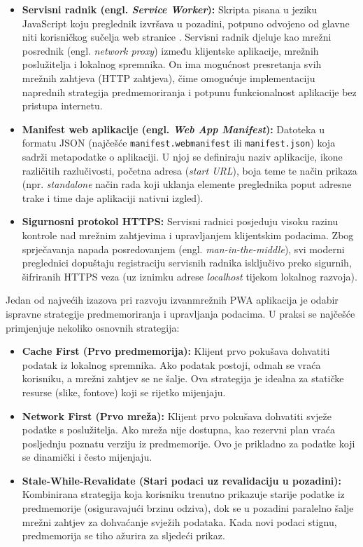 \documentclass[a4paper,12pt,oneside]{article}
\begin{document}
	\begin{itemize}
		\item \textbf{Servisni radnik (engl. \textit{Service Worker}):} Skripta pisana u jeziku JavaScript koju preglednik izvršava u pozadini, potpuno odvojeno od glavne niti korisničkog sučelja web stranice \cite{w_mdn_serviceworker}. Servisni radnik djeluje kao mrežni posrednik (engl. \textit{network proxy}) između klijentske aplikacije, mrežnih poslužitelja i lokalnog spremnika. On ima mogućnost presretanja svih mrežnih zahtjeva (HTTP zahtjeva), čime omogućuje implementaciju naprednih strategija predmemoriranja i potpunu funkcionalnost aplikacije bez pristupa internetu.
		
		\item \textbf{Manifest web aplikacije (engl. \textit{Web App Manifest}):} Datoteka u formatu JSON (najčešće \texttt{manifest.webmanifest} ili \texttt{manifest.json}) koja sadrži metapodatke o aplikaciji. U njoj se definiraju naziv aplikacije, ikone različitih razlučivosti, početna adresa (\textit{start URL}), boja teme te način prikaza (npr. \textit{standalone} način rada koji uklanja elemente preglednika poput adresne trake i time daje aplikaciji nativni izgled).
		
		\item \textbf{Sigurnosni protokol HTTPS:} Servisni radnici posjeduju visoku razinu kontrole nad mrežnim zahtjevima i upravljanjem klijentskim podacima. Zbog sprječavanja napada posredovanjem (engl. \textit{man-in-the-middle}), svi moderni preglednici dopuštaju registraciju servisnih radnika isključivo preko sigurnih, šifriranih HTTPS veza (uz iznimku adrese \textit{localhost} tijekom lokalnog razvoja).
	\end{itemize}
	
	Jedan od najvećih izazova pri razvoju izvanmrežnih PWA aplikacija je odabir ispravne strategije predmemoriranja i upravljanja podacima. U praksi se najčešće primjenjuje nekoliko osnovnih strategija:
	\begin{itemize}
		\item \textbf{Cache First (Prvo predmemorija):} Klijent prvo pokušava dohvatiti podatak iz lokalnog spremnika. Ako podatak postoji, odmah se vraća korisniku, a mrežni zahtjev se ne šalje. Ova strategija je idealna za statičke resurse (slike, fontove) koji se rijetko mijenjaju.
		
		\item \textbf{Network First (Prvo mreža):} Klijent prvo pokušava dohvatiti svježe podatke s poslužitelja. Ako mreža nije dostupna, kao rezervni plan vraća posljednju poznatu verziju iz predmemorije. Ovo je prikladno za podatke koji se dinamički i često mijenjaju.
		
		\item \textbf{Stale-While-Revalidate (Stari podaci uz revalidaciju u pozadini):} Kombinirana strategija koja korisniku trenutno prikazuje starije podatke iz predmemorije (osiguravajući brzinu odziva), dok se u pozadini paralelno šalje mrežni zahtjev za dohvaćanje svježih podataka. Kada novi podaci stignu, predmemorija se tiho ažurira za sljedeći prikaz.
	\end{itemize}
	
\end{document}
